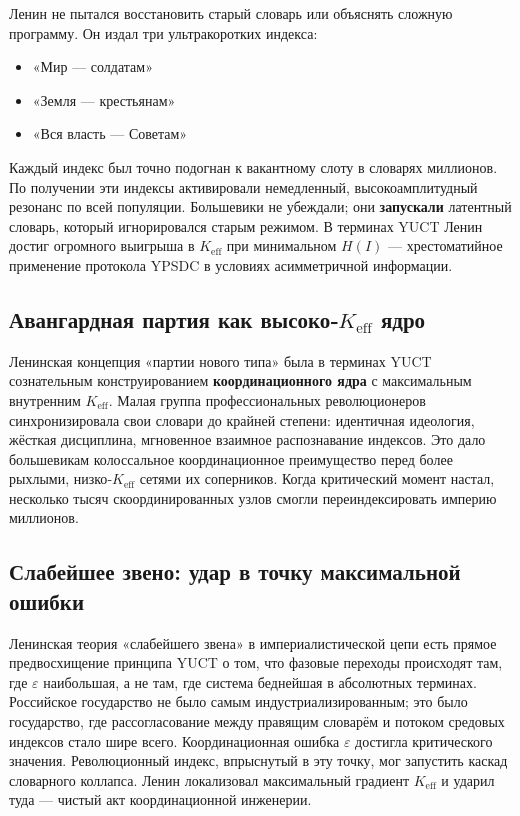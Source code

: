 \documentclass[12pt,a4paper]{article}
\begin{document}
	Ленин не пытался восстановить старый словарь или объяснять сложную программу. Он издал три ультракоротких индекса:
	\begin{itemize}[leftmargin=*]
		\item «Мир — солдатам»
		\item «Земля — крестьянам»
		\item «Вся власть — Советам»
	\end{itemize}
	Каждый индекс был точно подогнан к вакантному слоту в словарях миллионов. По получении эти индексы активировали немедленный, высокоамплитудный резонанс по всей популяции. Большевики не убеждали; они \textbf{запускали} латентный словарь, который игнорировался старым режимом. В терминах YUCT Ленин достиг огромного выигрыша в \(K_{\mathrm{eff}}\) при минимальном \(H(I)\) — хрестоматийное применение протокола YPSDC в условиях асимметричной информации.
	
	\subsection{Авангардная партия как высоко‑\(K_{\mathrm{eff}}\) ядро}
	
	Ленинская концепция «партии нового типа» была в терминах YUCT сознательным конструированием \textbf{координационного ядра} с максимальным внутренним \(K_{\mathrm{eff}}\). Малая группа профессиональных революционеров синхронизировала свои словари до крайней степени: идентичная идеология, жёсткая дисциплина, мгновенное взаимное распознавание индексов. Это дало большевикам колоссальное координационное преимущество перед более рыхлыми, низко‑\(K_{\mathrm{eff}}\) сетями их соперников. Когда критический момент настал, несколько тысяч скоординированных узлов смогли переиндексировать империю миллионов.
	
	\subsection{Слабейшее звено: удар в точку максимальной ошибки}
	
	Ленинская теория «слабейшего звена» в империалистической цепи есть прямое предвосхищение принципа YUCT о том, что фазовые переходы происходят там, где \(\varepsilon\) наибольшая, а не там, где система беднейшая в абсолютных терминах. Российское государство не было самым индустриализированным; это было государство, где рассогласование между правящим словарём и потоком средовых индексов стало шире всего. Координационная ошибка \(\varepsilon\) достигла критического значения. Революционный индекс, впрыснутый в эту точку, мог запустить каскад словарного коллапса. Ленин локализовал максимальный градиент \(K_{\mathrm{eff}}\) и ударил туда — чистый акт координационной инженерии.
	
\end{document}
